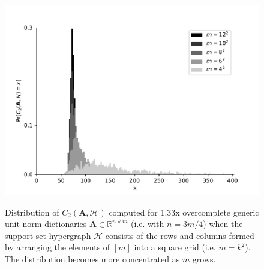 \begin{figure}\label{reasonableC2}
\begin{center}
\includegraphics[width=1 \linewidth]{figures/C2.pdf}
\caption{Distribution of $C_2(\mathbf{A}, \mathcal{H})$ computed for 1.33x overcomplete generic unit-norm dictionaries $\mathbf{A} \in \mathbb{R}^{n \times m}$ (i.e. with $n = 3m/4$) when the support set hypergraph $\mathcal{H}$ consists of the rows and columns formed by arranging  the elements of $[m]$ into a square grid (i.e. $m = k^2$). The distribution becomes more concentrated as $m$ grows.}
\vspace{-.6 cm}
\label{samples_vs_m}
\end{center}
\end{figure}


